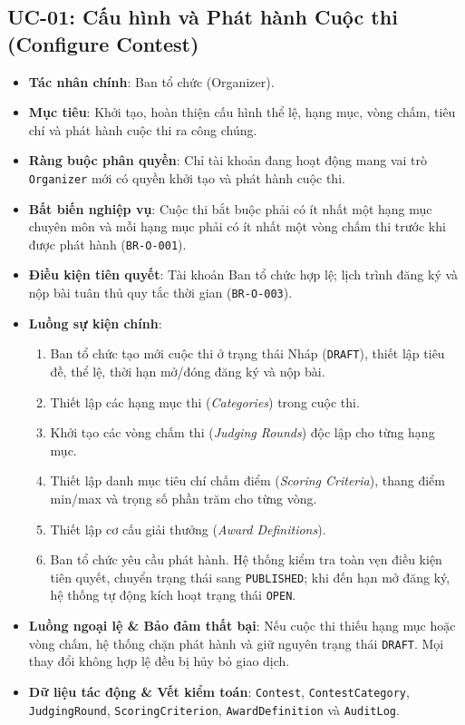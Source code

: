 \subsection{UC-01: Cấu hình và Phát hành Cuộc thi (Configure Contest)}
\begin{itemize}
    \item \textbf{Tác nhân chính}: Ban tổ chức (Organizer).
    \item \textbf{Mục tiêu}: Khởi tạo, hoàn thiện cấu hình thể lệ, hạng mục, vòng chấm, tiêu chí và phát hành cuộc thi ra công chúng.
    \item \textbf{Ràng buộc phân quyền}: Chỉ tài khoản đang hoạt động mang vai trò \texttt{Organizer} mới có quyền khởi tạo và phát hành cuộc thi.
    \item \textbf{Bất biến nghiệp vụ}: Cuộc thi bắt buộc phải có ít nhất một hạng mục chuyên môn và mỗi hạng mục phải có ít nhất một vòng chấm thi trước khi được phát hành (\texttt{BR-O-001}).
    \item \textbf{Điều kiện tiên quyết}: Tài khoản Ban tổ chức hợp lệ; lịch trình đăng ký và nộp bài tuân thủ quy tắc thời gian (\texttt{BR-O-003}).
    \item \textbf{Luồng sự kiện chính}:
    \begin{enumerate}
        \item Ban tổ chức tạo mới cuộc thi ở trạng thái Nháp (\texttt{DRAFT}), thiết lập tiêu đề, thể lệ, thời hạn mở/đóng đăng ký và nộp bài.
        \item Thiết lập các hạng mục thi (\textit{Categories}) trong cuộc thi.
        \item Khởi tạo các vòng chấm thi (\textit{Judging Rounds}) độc lập cho từng hạng mục.
        \item Thiết lập danh mục tiêu chí chấm điểm (\textit{Scoring Criteria}), thang điểm min/max và trọng số phần trăm cho từng vòng.
        \item Thiết lập cơ cấu giải thưởng (\textit{Award Definitions}).
        \item Ban tổ chức yêu cầu phát hành. Hệ thống kiểm tra toàn vẹn điều kiện tiên quyết, chuyển trạng thái sang \texttt{PUBLISHED}; khi đến hạn mở đăng ký, hệ thống tự động kích hoạt trạng thái \texttt{OPEN}.
    \end{enumerate}
    \item \textbf{Luồng ngoại lệ \& Bảo đảm thất bại}: Nếu cuộc thi thiếu hạng mục hoặc vòng chấm, hệ thống chặn phát hành và giữ nguyên trạng thái \texttt{DRAFT}. Mọi thay đổi không hợp lệ đều bị hủy bỏ giao dịch.
    \item \textbf{Dữ liệu tác động \& Vết kiểm toán}: \texttt{Contest}, \texttt{ContestCategory}, \\ \texttt{JudgingRound}, \texttt{ScoringCriterion}, \texttt{AwardDefinition} và \texttt{AuditLog}.
\end{itemize}

